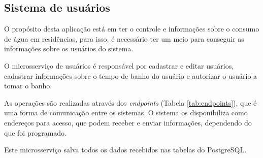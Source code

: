 \subsection{Sistema de usuários} \label{sec:usuarios}

O propósito desta aplicação está em ter o controle e informações sobre o consumo de água em residências, para isso, é necessário ter um meio para conseguir as informações sobre os usuários do sistema. 

O microsserviço de usuários é responsável por cadastrar e editar usuários, cadastrar informações sobre o tempo de banho do usuário e autorizar o usuário a tomar o banho.

As operações são realizadas através dos \textit{endpoints} (Tabela \ref{tab:endpoints}), que é uma forma de comunicação entre os sistemas. O sistema os disponibiliza como endereços para acesso, que podem receber e enviar informações, dependendo do que foi programado.

Este microsserviço salva todos os dados recebidos nas tabelas do PostgreSQL.


